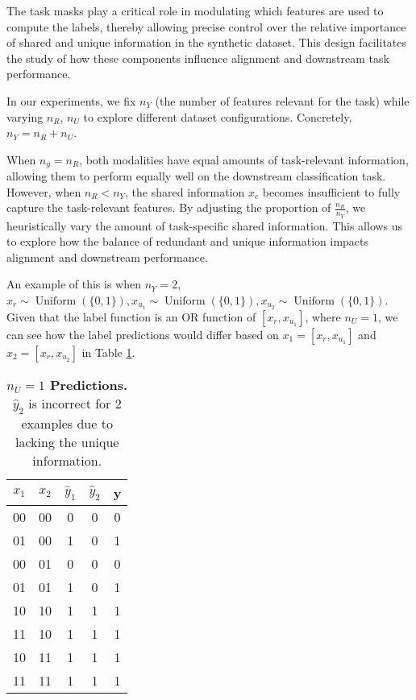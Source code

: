 The task masks play a critical role in modulating which features are used to compute the labels, thereby allowing precise control over the relative importance of shared and unique information in the synthetic dataset. This design facilitates the study of how these components influence alignment and downstream task performance.

In our experiments, we fix \(n_Y\) (the number of features relevant for the task) while varying \(n_R\), \(n_{U}\) to explore different dataset configurations. Concretely, \(n_Y = n_R + n_{U}\).

When \(n_y = n_R\), both modalities have equal amounts of task-relevant information, allowing them to perform equally well on the downstream classification task. However, when \(n_R < n_Y\), the shared information \(x_c\) becomes insufficient to fully capture the task-relevant features. By adjusting the proportion of \(\frac{n_R}{n_Y}\), we heuristically vary the amount of task-specific shared information. This allows us to explore how the balance of redundant and unique information impacts alignment and downstream performance.

An example of this is when $n_Y=2$,  \(
x_r \sim \operatorname{Uniform}(\{0, 1\}), x_{u_1} \sim \operatorname{Uniform}(\{0, 1\}),x_{u_2} \sim \operatorname{Uniform}(\{0, 1\})\). Given that the label function is an OR function of $[x_r, x_{u_1}]$, where $n_U=1$, we can see how the label predictions would differ based on $x_1 = [x_r, x_{u_1}]$ and $x_2 = [x_r, x_{u_2}]$ in Table \ref{tab:u=1}.
\begin{table}[ht!]
    \centering
    \begin{tabular}{c|c|c|c|c}
       $x_1$  & $x_2$  & $\hat{y}_1$ & $\hat{y}_2$ & y\\
       \hline
        00 & 00 & 0 & 0 & 0 \\
        01 & 00 & 1 & 0 & 1\\
        00 & 01 & 0 & 0 & 0 \\ 
        01 & 01 & 1 & 0 & 1\\ 
        10 & 10 & 1 & 1 & 1\\ 
        11 & 10 & 1 & 1 & 1 \\ 
        10 & 11 & 1 & 1 & 1 \\ 
        11 & 11 & 1 & 1 & 1\\
        
    \end{tabular}
    \caption{\textbf{$n_U=1$ Predictions.} $\hat{y}_2$ is incorrect for 2 examples due to lacking the unique information.}
    \label{tab:u=1}
\end{table}

